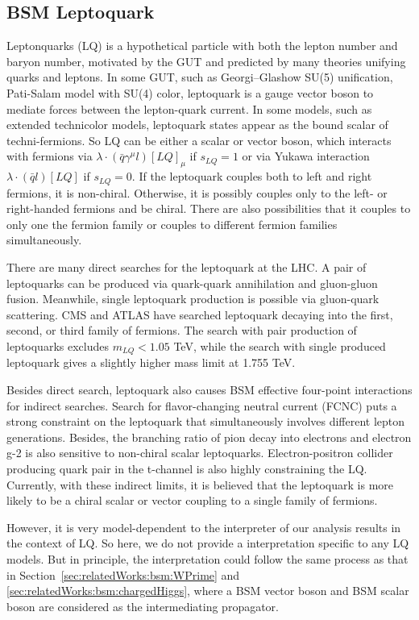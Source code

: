 \FloatBarrier

\subsection{BSM Leptoquark}
\label{sec:relatedWorks:bsm:leptoquark}


Leptonquarks (LQ) is a hypothetical particle with both the lepton number and baryon number, motivated by the GUT and predicted by many theories unifying quarks and leptons. In some GUT, such as Georgi–Glashow SU(5) unification, Pati-Salam model with SU(4) color, leptoquark is a gauge vector boson to mediate forces between the lepton-quark current. In some models, such as extended technicolor models, leptoquark states appear as the bound scalar of techni-fermions. So LQ can be either a scalar or vector boson, which interacts with fermions via $\lambda \cdot (\bar{q} \gamma^\mu l) [LQ]_\mu$ if $s_{LQ}=1$ or via Yukawa interaction $\lambda \cdot (\bar{q}l) [LQ] $ if $s_{LQ}=0$. If the leptoquark couples both to left and right fermions, it is non-chiral. Otherwise, it is possibly couples only to the left- or right-handed fermions and be chiral. There are also possibilities that it couples to only one the fermion family or couples to different fermion families simultaneously. 

There are many direct searches for the leptoquark at the LHC. A pair of leptoquarks can be produced via quark-quark annihilation and gluon-gluon fusion. Meanwhile, single leptoquark production is possible via gluon-quark scattering. CMS and ATLAS have searched leptoquark decaying into the first, second, or third family of fermions. The search with pair production of leptoquarks excludes $m_{LQ}<1.05$ TeV, while the search with single produced leptoquark gives a slightly higher mass limit at 1.755 TeV. 

Besides direct search, leptoquark also causes BSM effective four-point interactions for indirect searches. Search for flavor-changing neutral current (FCNC) puts a strong constraint on the leptoquark that simultaneously involves different lepton generations. Besides, the branching ratio of pion decay into electrons and electron g-2 is also sensitive to non-chiral scalar leptoquarks. Electron-positron collider producing quark pair in the t-channel is also highly constraining the LQ.  Currently, with these indirect limits, it is believed that the leptoquark is more likely to be a chiral scalar or vector coupling to a single family of fermions.

However, it is very model-dependent to the interpreter of our analysis results in the context of LQ. So here, we do not provide a interpretation specific to any LQ models. But in principle, the interpretation could follow the same process as that in Section~\ref{sec:relatedWorks:bsm:WPrime} and \ref{sec:relatedWorks:bsm:chargedHiggs}, where a BSM vector boson and BSM scalar boson are considered as the intermediating propagator.



